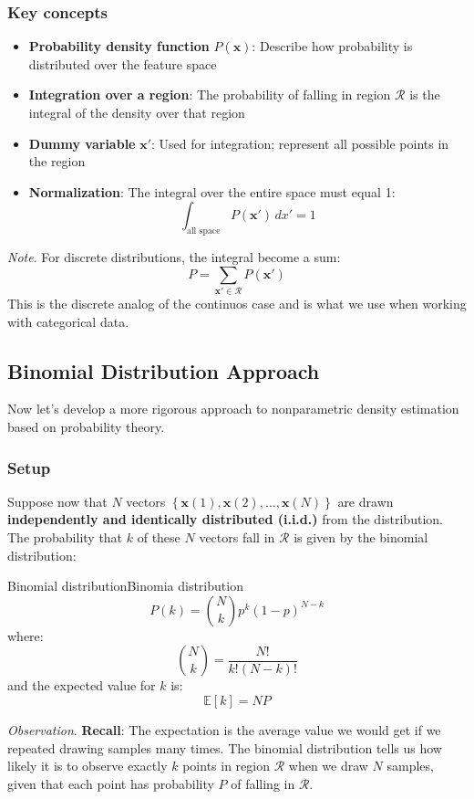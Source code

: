 \documentclass[a4paper]{article}
\theoremstyle{definition}
\begin{document}
\subsubsection{Key concepts}
\begin{itemize}
    \item \textbf{Probability density function} \( P(\mathbf{x}) \): Describe how probability is distributed over the feature space
    \item \textbf{Integration over a region}: The probability of falling in region \( \mathcal{R} \) is the integral of the density over that region
    \item \textbf{Dummy variable} \( \mathbf{x}' \): Used for integration; represent all possible points in the region
    \item \textbf{Normalization}: The integral over the entire space must equal 1:
    \[
      \int_{\text{all space}} P(\mathbf{x}') \,dx' = 1
    \]
\end{itemize}
\textit{Note}. For discrete distributions, the integral become a sum:
\[
  P = \sum_{\mathbf{x}' \in \mathcal{R}} P(\mathbf{x}')
\]
This is the discrete analog of the continuos case and is what we use when working with categorical data.
\subsection{Binomial Distribution Approach}
Now let's develop a more rigorous approach to nonparametric density estimation based on probability theory.
\subsubsection{Setup}
Suppose now that \( N \) vectors \( \left\{ \mathbf{x}(1), \mathbf{x}(2), \ldots, \mathbf{x}(N) \right\} \) are drawn \textbf{independently and identically
distributed (i.i.d.)} from the distribution. The probability that \( k \) of these \( N \) vectors fall in \( \mathcal{R} \) is given by the binomial distribution:
\begin{definition}{Binomial distribution}{Binomia distribution}
\[
  P(k) = \binom{N}{k} p^k(1 - p)^{N - k} 
\]
where:
\[
  \binom{N}{k} = \frac{N!}{k!(N - k)!}
\]
and the expected value for \( k \) is:
\[
  \mathbb{E}[k] = NP
\]
\end{definition}
\textit{Observation}. \textbf{Recall}: The expectation is the average value we would get if we repeated drawing samples many times.
\vspace{1em}
\noindent
\newline
The binomial distribution tells us how likely it is to observe exactly \( k \) points in region \( \mathcal{R} \) when we draw \( N \) samples, given that each 
point has probability \( P \) of falling in \( \mathcal{R} \).
\end{document}
